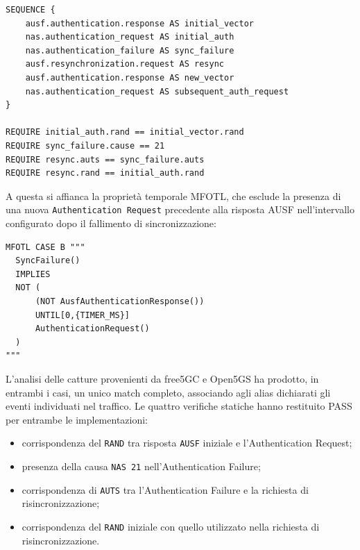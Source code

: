 \par\noindent\begin{minipage}{\linewidth}
\begin{lstlisting}
SEQUENCE {
    ausf.authentication.response AS initial_vector
    nas.authentication_request AS initial_auth
    nas.authentication_failure AS sync_failure
    ausf.resynchronization.request AS resync
    ausf.authentication.response AS new_vector
    nas.authentication_request AS subsequent_auth_request
}

REQUIRE initial_auth.rand == initial_vector.rand
REQUIRE sync_failure.cause == 21
REQUIRE resync.auts == sync_failure.auts
REQUIRE resync.rand == initial_auth.rand
\end{lstlisting}
\end{minipage}\par

A questa si affianca la proprietà temporale MFOTL, che esclude la presenza di una nuova \texttt{Authentication\ Request} precedente alla risposta AUSF nell'intervallo configurato dopo il fallimento di sincronizzazione:

\par\noindent\begin{minipage}{\linewidth}
\begin{lstlisting}
MFOTL CASE B """
  SyncFailure()
  IMPLIES
  NOT (
      (NOT AusfAuthenticationResponse())
      UNTIL[0,{TIMER_MS}]
      AuthenticationRequest()
  )
"""
\end{lstlisting}
\end{minipage}\par

L'analisi delle catture provenienti da free5GC e Open5GS ha prodotto, in entrambi i casi, un unico match completo, associando agli alias dichiarati gli eventi individuati nel traffico. Le quattro verifiche statiche hanno restituito PASS per entrambe le implementazioni:

\begin{itemize}
\tightlist
\item
  corrispondenza del \texttt{RAND} tra risposta \texttt{AUSF} iniziale e l'Authentication Request;
\item
  presenza della causa \texttt{NAS\ 21} nell'Authentication Failure;
\item
  corrispondenza di \texttt{AUTS} tra l'Authentication Failure e la richiesta di risincronizzazione;
\item
  corrispondenza del \texttt{RAND} iniziale con quello utilizzato nella richiesta di risincronizzazione.
\end{itemize}

